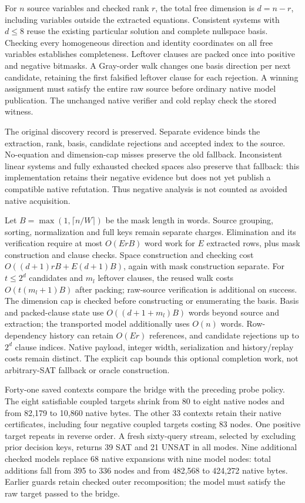 \documentclass[11pt,a4paper]{article}
\numberwithin{equation}{section}
\theoremstyle{plain}
\theoremstyle{definition}
\theoremstyle{remark}
\begin{document}
For $n$ source variables and checked rank $r$, the total free dimension is
$d=n-r$, including variables outside the extracted equations. Consistent
systems with $d\leq8$ reuse the existing particular solution and complete
nullspace basis. Checking every homogeneous direction and identity coordinates
on all free variables establishes completeness. Leftover clauses are packed
once into positive and negative bitmasks. A Gray-order walk changes one basis
direction per next candidate, retaining the first falsified leftover clause
for each rejection. A winning assignment must satisfy the entire raw source
before ordinary native model publication. The unchanged native verifier and
cold replay check the stored witness.

The original discovery record is preserved. Separate evidence binds the
extraction, rank, basis, candidate rejections and accepted index to the source.
No-equation and dimension-cap misses preserve the old fallback. Inconsistent
linear systems and fully exhausted checked spaces also preserve that fallback:
this implementation retains their negative evidence but does not yet publish
a compatible native refutation. Thus negative analysis is not counted as
avoided native acquisition.

Let $B=\max(1,\lceil n/W\rceil)$ be the mask length in words. Source grouping,
sorting, normalization and full keys remain separate charges. Elimination and
its verification require at most $O(ErB)$ word work for $E$ extracted rows,
plus mask construction and clause checks. Space construction and checking cost
$O((d+1)rB+E(d+1)B)$, again with mask construction separate. For $t\leq2^d$
candidates and $m_l$ leftover clauses, the reused walk costs
$O(t(m_l+1)B)$ after packing; raw-source verification is additional on success.
The dimension cap is checked before constructing or enumerating the basis.
Basis and packed-clause state use $O((d+1+m_l)B)$ words beyond source and extraction;
the transported model additionally uses $O(n)$ words.
Row-dependency history can retain $O(Er)$ references, and candidate rejections
up to $2^d$ clause indices. Native payload, integer width, serialization and
history/replay costs remain distinct. The explicit cap bounds this optional
completion work, not arbitrary-SAT fallback or oracle construction.

Forty-one saved contexts compare the bridge with the preceding probe policy.
The eight satisfiable coupled targets shrink from 80 to eight native nodes and
from 82,179 to 10,860 native bytes. The other 33 contexts retain their native
certificates, including four negative coupled targets costing 83 nodes.
One positive target repeats in reverse order. A fresh sixty-query stream,
selected by excluding prior decision keys, returns 39 SAT and 21 UNSAT in all modes. Nine additional checked models
replace 68 native expansions with nine model nodes: total additions fall from
395 to 336 nodes and from 482,568 to 424,272 native bytes. Earlier guards retain
checked outer recomposition; the model must satisfy the raw target passed to
the bridge.
\end{document}
